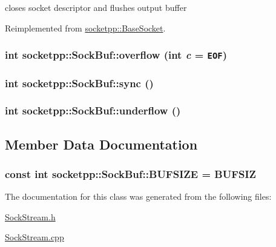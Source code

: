 closes socket descriptor and flushes output buffer 



Reimplemented from \hyperlink{classsocketpp_1_1BaseSocket_f067195056bb6b5a65c4bc1d2ac7da72}{socketpp::BaseSocket}.\hypertarget{classsocketpp_1_1SockBuf_5a1f6d2304fe83a8602e07d12032b2c7}{
\subsubsection[{overflow}]{\setlength{\rightskip}{0pt plus 5cm}int socketpp::SockBuf::overflow (int {\em c} = {\tt EOF})}}
\label{classsocketpp_1_1SockBuf_5a1f6d2304fe83a8602e07d12032b2c7}


\hypertarget{classsocketpp_1_1SockBuf_33c3d2907102b5b38daca32fb2c12591}{
\subsubsection[{sync}]{\setlength{\rightskip}{0pt plus 5cm}int socketpp::SockBuf::sync ()}}
\label{classsocketpp_1_1SockBuf_33c3d2907102b5b38daca32fb2c12591}


\hypertarget{classsocketpp_1_1SockBuf_34ccc364e9f20a25199bea9fdde19bdd}{
\subsubsection[{underflow}]{\setlength{\rightskip}{0pt plus 5cm}int socketpp::SockBuf::underflow ()}}
\label{classsocketpp_1_1SockBuf_34ccc364e9f20a25199bea9fdde19bdd}




\subsection{Member Data Documentation}
\hypertarget{classsocketpp_1_1SockBuf_2b90c5705f30dd3fda03a6eb13378e15}{
\subsubsection[{BUFSIZE}]{\setlength{\rightskip}{0pt plus 5cm}const int {\bf socketpp::SockBuf::BUFSIZE} = BUFSIZ}}
\label{classsocketpp_1_1SockBuf_2b90c5705f30dd3fda03a6eb13378e15}




The documentation for this class was generated from the following files:\begin{CompactItemize}
\item 
\hyperlink{SockStream_8h}{SockStream.h}\item 
\hyperlink{SockStream_8cpp}{SockStream.cpp}\end{CompactItemize}
